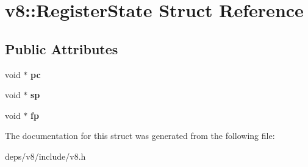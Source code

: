 \hypertarget{structv8_1_1_register_state}{}\section{v8\+:\+:Register\+State Struct Reference}
\label{structv8_1_1_register_state}
\subsection*{Public Attributes}
\begin{DoxyCompactItemize}
\item 
\hypertarget{structv8_1_1_register_state_aa0d0327871d9f95d5e64f47b7f183907}{}void $\ast$ {\bfseries pc}\label{structv8_1_1_register_state_aa0d0327871d9f95d5e64f47b7f183907}

\item 
\hypertarget{structv8_1_1_register_state_a867bb9d0b9e81c3f7256aa81dc0daee4}{}void $\ast$ {\bfseries sp}\label{structv8_1_1_register_state_a867bb9d0b9e81c3f7256aa81dc0daee4}

\item 
\hypertarget{structv8_1_1_register_state_aaeb80a1d7f6df3ae418f3e9b1295d156}{}void $\ast$ {\bfseries fp}\label{structv8_1_1_register_state_aaeb80a1d7f6df3ae418f3e9b1295d156}

\end{DoxyCompactItemize}


The documentation for this struct was generated from the following file\+:\begin{DoxyCompactItemize}
\item 
deps/v8/include/v8.\+h\end{DoxyCompactItemize}
